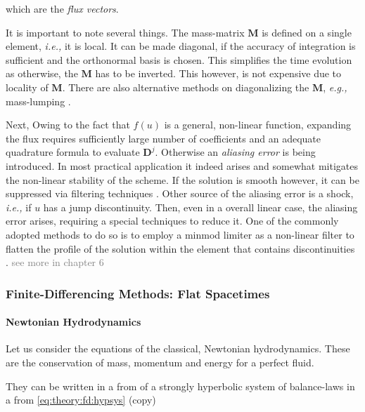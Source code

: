 which are the \textit{flux vectors}.

It is important to note several things. 
The mass-matrix $\boldsymbol{M}$ is defined on a single element, \textit{i.e.,} it is local. It can be made diagonal, if the accuracy of integration is sufficient and the orthonormal basis is chosen. This simplifies the time evolution as otherwise, the $\boldsymbol{M}$ has to be inverted. This however, is not expensive due to locality of $\boldsymbol{M}$. There are also alternative methods on diagonalizing the $\boldsymbol{M}$, \textit{e.g.,} mass-lumping \cite{Canuto:2008}.  

Next, Owing to the fact that $f(u)$ is a general, non-linear function, expanding the flux requires sufficiently large number of coefficients and an adequate quadrature formula to evaluate $\boldsymbol{D}^j$. Otherwise an \textit{aliasing error} is being introduced. 
In most practical application it indeed arises and somewhat mitigates the non-linear stability of the scheme. If the solution is smooth however, it can be suppressed via filtering techniques \cite{Hesthaven:2007}. 
Other source of the aliasing error is a shock, \textit{i.e.,} if $u$ has a jump discontinuity. Then, even in a overall linear case, the aliasing error arises, requiring a special techniques to reduce it. One of the commonly adopted methods to do so is to employ a minmod limiter as a non-linear filter to flatten the profile of the solution within the element that contains discontinuities \cite{Cockburn:2001}. \textcolor{gray}{see more in chapter 6}


\subsubsection*{Finite-Differencing Methods: Flat Spacetimes}


\paragraph{Newtonian Hydrodynamics}

Let us consider the equations of the classical, Newtonian hydrodynamics. 
These are the conservation of mass, momentum and energy for a perfect fluid. 

They can be written in a from of a strongly hyperbolic system of balance-laws in a from \ref{eq:theory:fd:hypsys} (copy)

